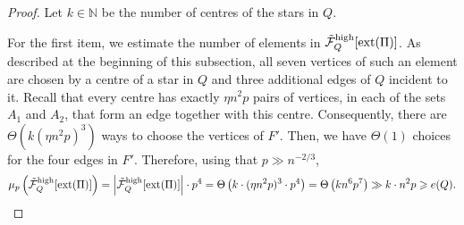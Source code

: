 \documentclass[11pt,a4paper,oneside,reqno]{amsart}
\newcommand{\cF}{\mathcal{F}}
\newcommand{\1}{\mathbbm{1}} %
\renewcommand{\ge}{\geqslant}
\newcommand{\cTFQH}{\Tilde{\cF}_Q^{\mathrm{high}}}
\newcommand{\ext}{\mathrm{ext}}
\begin{document}
\begin{proof}
    Let $k \in \mathbb{N}$ be the number of centres of the stars in $Q$.

    For the first item, we estimate the number of elements in $\cTFQH[\ext(\Pi)]$. As described at the beginning of this subsection, all seven vertices of such an element are chosen by a centre of a star in $Q$ and three additional edges of $Q$ incident to it. Recall that every centre has exactly $\eta n^2 p$ pairs of vertices, in each of the sets $A_1$ and $A_2$, that form an edge together with this centre. Consequently, there are $\Theta\left(k (\eta n^2 p)^3\right)$ ways to choose the vertices of $F'$. Then, we have $\Theta(1)$ choices for the four edges in $F'$. Therefore, using that $p \gg n^{-2/3}$,
    \begin{align}\label{align:mu-bound-high-degree}
        \mu_p\left(\cTFQH[\ext(\Pi)]\right) = \left|\cTFQH[\ext(\Pi)]\right| \cdot p^4 = \Theta\left(k \cdot (\eta n^2 p)^3 \cdot p^4\right) = \Theta\left(k n^6 p^7\right) \gg k \cdot n^2 p \ge e(Q).
    \end{align}


\end{proof}
\end{document}
